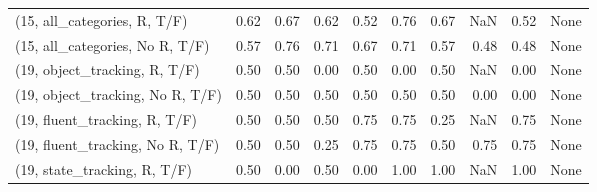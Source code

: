 \begin{table*}[h!]
\begin{adjustbox}{width=2\columnwidth,center}
\begin{tabular}{lrrr|rrr|rrr}
(15, all\_categories, R, T/F)          &                      0.62 &                  0.67 &                      0.62 &                          0.52 &                      0.76 &                          0.67 &                                    NaN &                               0.52 &                                  None \\
(15, all\_categories, No R, T/F)       &                      0.57 &                  0.76 &                      0.71 &                          0.67 &                      0.71 &                          0.57 &                                   0.48 &                               0.48 &                                  None \\



\midrule
(19, object\_tracking, R, T/F)         &                      0.50 &                  0.50 &                      0.00 &                          0.50 &                      0.00 &                          0.50 &                                    NaN &                               0.00 &                                  None \\
(19, object\_tracking, No R, T/F)      &                      0.50 &                  0.50 &                      0.50 &                          0.50 &                      0.50 &                          0.50 &                                   0.00 &                               0.00 &                                  None \\
(19, fluent\_tracking, R, T/F)         &                      0.50 &                  0.50 &                      0.50 &                          0.75 &                      0.75 &                          0.25 &                                    NaN &                               0.75 &                                  None \\
(19, fluent\_tracking, No R, T/F)      &                      0.50 &                  0.50 &                      0.25 &                          0.75 &                      0.75 &                          0.50 &                                   0.75 &                               0.75 &                                  None \\
(19, state\_tracking, R, T/F)          &                      0.50 &                  0.00 &                      0.50 &                          0.00 &                      1.00 &                          1.00 &                                    NaN &                               1.00 &                                  None \\

\end{tabular}
\end{adjustbox}
\end{table*}

